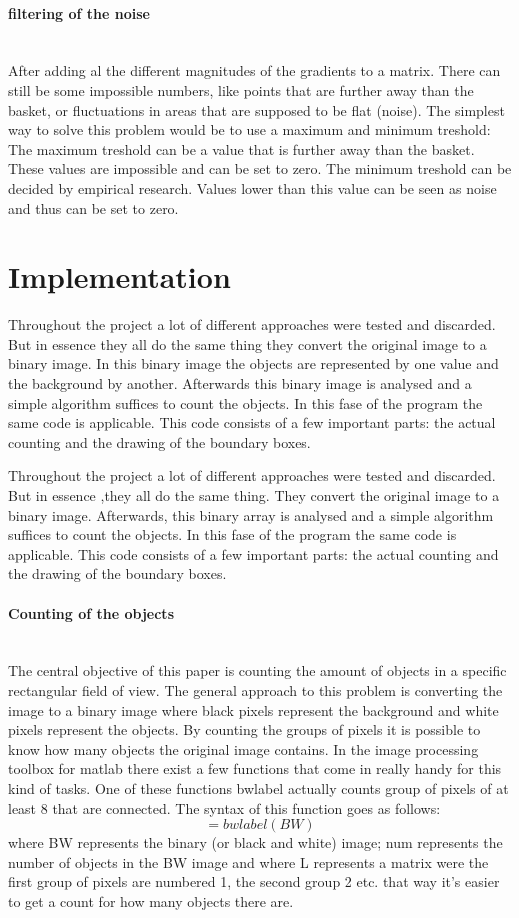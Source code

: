 \documentclass[11pt]{article}
\begin{document}
\paragraph{filtering of the noise}\mbox{}\\
After adding al the different magnitudes of the gradients to a matrix. There can still be some impossible numbers, like points that are further away than the basket, or fluctuations in areas that are supposed to be flat (noise). The simplest way to solve this problem would be to use a maximum and minimum treshold: The maximum treshold can be a value that is further away than the basket. These values are impossible and can be set to zero. The minimum treshold can be decided by empirical research. Values lower than this value can be seen as noise and thus can be set to zero.

\section{Implementation}
Throughout the project a lot of different approaches were tested and discarded. But in essence they all do the same thing they convert the original image to a binary image. In this binary image the objects are represented by one value and the background by another. Afterwards this binary image is analysed and a simple algorithm suffices to count the objects. In this fase of the program the same code is applicable. This code consists of a few important parts: the actual counting and the drawing of the boundary boxes. 

Throughout the project a lot of different approaches were tested and discarded. But in essence ,they all do the same thing. They convert the original image to a binary image. Afterwards, this binary array is analysed and a simple algorithm suffices to count the objects. In this fase of the program the same code is applicable. This code consists of a few important parts: the actual counting and the drawing of the boundary boxes. 
\paragraph{Counting of the objects}\mbox{}\\
The central objective of this paper is counting the amount of objects in a specific rectangular field of view. The general approach to this problem is converting the image to a binary image where black pixels represent the background and white pixels represent the objects. By counting the groups of pixels it is possible to know how many objects the original image contains. In the image processing toolbox for matlab there exist a few functions that come in really handy for this kind of tasks. One of these functions bwlabel actually counts group of pixels of at least 8 that are connected. The syntax of this function goes as follows: 
\begin{equation}
[L, num] = bwlabel(BW)
\end{equation}
where BW represents the binary (or black and white) image; num represents the number of objects in the BW image and where L represents a matrix were the first group of pixels are numbered 1, the second group 2 etc. that way it's easier to get a count for how many objects there are.
\end{document}
